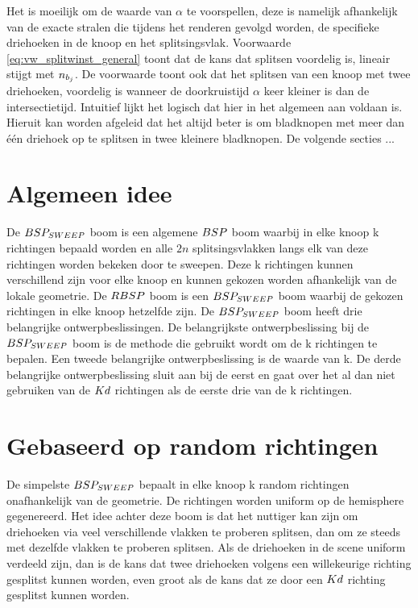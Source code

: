 Het is moeilijk om de waarde van $\alpha$ te voorspellen, deze is namelijk afhankelijk van de exacte stralen die tijdens het renderen gevolgd worden, de specifieke driehoeken in de knoop en het splitsingsvlak. Voorwaarde \ref{eq:vw_splitwinst_general} toont dat de kans dat splitsen voordelig is, lineair stijgt met $n_{b_j}$. De voorwaarde toont ook dat het splitsen van een knoop met twee driehoeken, voordelig is wanneer de doorkruistijd $\alpha$ keer kleiner is dan de intersectietijd. Intuitief lijkt het logisch dat hier in het algemeen aan voldaan is. Hieruit kan worden afgeleid dat het altijd beter is om bladknopen met meer dan één driehoek op te splitsen in twee kleinere bladknopen. De volgende secties ... \\



\section{Algemeen idee}
    De $BSP_{SWEEP}$ boom is een algemene $BSP$ boom waarbij in elke knoop k richtingen bepaald worden en alle $2n$ splitsingsvlakken langs elk van deze richtingen worden bekeken door te sweepen.
    Deze k richtingen kunnen verschillend zijn voor elke knoop en kunnen gekozen worden afhankelijk van de lokale geometrie.
    De $RBSP$ boom is een $BSP_{SWEEP}$ boom waarbij de gekozen richtingen in elke knoop hetzelfde zijn.
    De $BSP_{SWEEP}$ boom heeft drie belangrijke ontwerpbeslissingen.
    De belangrijkste ontwerpbeslissing bij de $BSP_{SWEEP}$ boom is de methode die gebruikt wordt om de k richtingen te bepalen.
    Een tweede belangrijke ontwerpbeslissing is de waarde van k.
    De derde belangrijke ontwerpbeslissing sluit aan bij de eerst en gaat over het al dan niet gebruiken van de $Kd$ richtingen als de eerste drie van de k richtingen.
    \\


\section{Gebaseerd op random richtingen}
De simpelste $BSP_{SWEEP}$ bepaalt in elke knoop k random richtingen onafhankelijk van de geometrie.
De richtingen worden uniform op de hemisphere gegenereerd.
Het idee achter deze boom is dat het nuttiger kan zijn om driehoeken via veel verschillende vlakken te proberen splitsen, dan om ze steeds met dezelfde vlakken te proberen splitsen.
Als de driehoeken in de scene uniform verdeeld zijn, dan is de kans dat twee driehoeken volgens een willekeurige richting gesplitst kunnen worden, even groot als de kans dat ze door een $Kd$ richting gesplitst kunnen worden.

